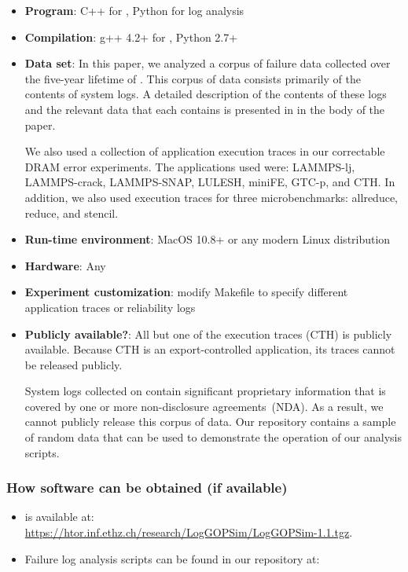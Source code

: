 {\small
\begin{itemize}
  \item {\bf Program}: C++ for \LogGOPSim, Python for log analysis
  \item {\bf Compilation}: g++ 4.2+ for \LogGOPSim, Python 2.7+
  \item {\bf Data set}: In this paper, we analyzed a corpus of failure data collected over
  the five-year lifetime of \cielo.  This corpus of data consists primarily of the contents
  of system logs.  A detailed description of the contents of these logs and the relevant 
  data that each contains is presented in  in the body of the paper.

  We also used a collection of application execution traces in our correctable DRAM error 
  experiments.  The applications used were: LAMMPS-lj, LAMMPS-crack, LAMMPS-SNAP,
  LULESH, miniFE, GTC-p, and CTH.  In addition, we also used execution traces for three 
  microbenchmarks: allreduce, reduce, and stencil.
  \item {\bf Run-time environment}: MacOS 10.8+ or any modern Linux distribution
  \item {\bf Hardware}: Any
  \item {\bf Experiment customization}: modify Makefile to specify different application
  traces or reliability logs
  \item {\bf Publicly available?}: All but one of the execution traces (CTH) is publicly 
  available.  Because CTH is an export-controlled application, its traces cannot be 
  released publicly.  

  System logs collected on \cielo contain significant proprietary information that is 
  covered by one or more non-disclosure agreements~(NDA).  As a result, we cannot publicly
  release this corpus of data.  Our repository contains a sample of random data that can
  be used to demonstrate the operation of our analysis scripts.
\end{itemize}
}

\subsubsection{How software can be obtained (if available)}
\begin{itemize}
\item \LogGOPSim is available at:\\
    \url{https://htor.inf.ethz.ch/research/LogGOPSim/LogGOPSim-1.1.tgz}.  

\item Failure log analysis scripts can be found in our repository at: 
\end{itemize}

